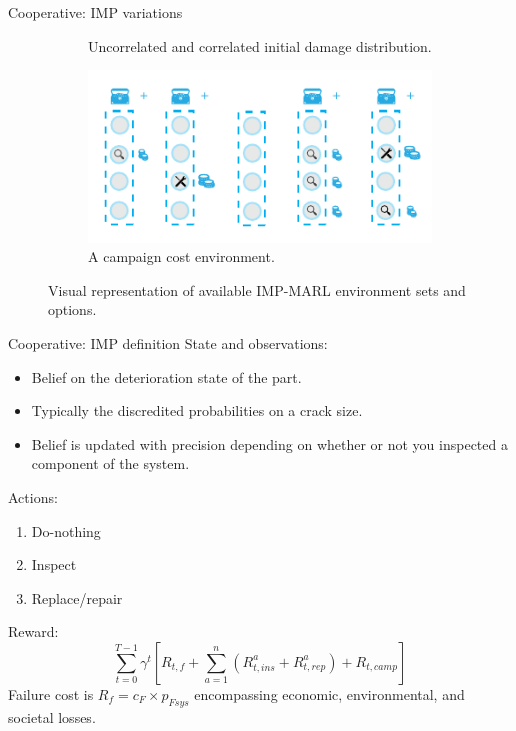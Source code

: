 \documentclass[9pt, hyperref={pdfusetitle,colorlinks=true,allcolors=DarkBlue}]{beamer}
\begin{document}
\begin{frame}{Cooperative: IMP variations}
\begin{figure}
\begin{subfigure}[t]{0.53\textwidth}
    \caption{Uncorrelated and correlated initial damage distribution.}
    \label{fig:env_categories_3}
\end{subfigure}%
\begin{subfigure}[t]{0.47\textwidth}
\centering
    \includegraphics[width=1\linewidth]{fig2_mul/environments_v2_d.pdf}
    \caption{A campaign cost environment.}
    \label{fig:env_categories_4}
\end{subfigure}
\caption{
Visual representation of available IMP-MARL environment sets and options.}
\end{figure}
\end{frame}


\begin{frame}{Cooperative: IMP definition}
State and observations:
\begin{itemize}
    \item Belief on the deterioration state of the part.
    \item Typically the discredited probabilities on a crack size.
    \item Belief is updated with precision depending on whether or not you inspected a component of the system. 
\end{itemize}
Actions: 
\begin{enumerate}
    \item Do-nothing
    \item Inspect
    \item Replace/repair
\end{enumerate}
Reward:
\begin{equation}
     \sum_{t=0}^{T-1} \gamma^t \left[ R_{t,f}+ \sum_{a=1}^n \left({R_{t,ins}^a} + {R_{t,rep}^a}\right)+R_{t,camp} \right]
    \label{eq:totalcost}
\end{equation}
Failure cost is $R_f = c_F \times p_{Fsys}$ encompassing economic, environmental, and societal losses.
\end{frame}
\end{document}
